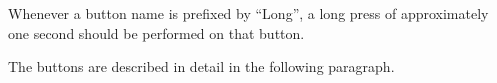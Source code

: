 %
Whenever a button name is prefixed by ``Long'', a long press of approximately
one second should be performed on that button.

The buttons are described in
detail in the following paragraph.

